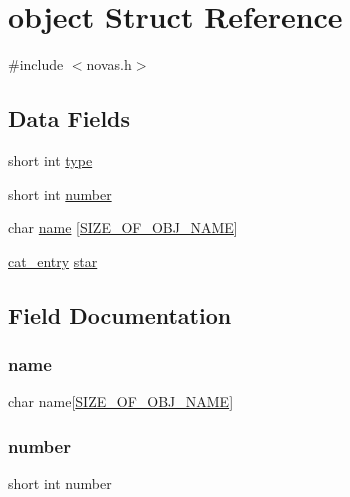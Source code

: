 \hypertarget{structobject}{}\section{object Struct Reference}
\label{structobject}


{\ttfamily \#include $<$novas.\+h$>$}

\subsection*{Data Fields}
\begin{DoxyCompactItemize}
\item 
short int \mbox{\hyperlink{structobject_aaa8ba4297d83f2cce5af75b18564ae13}{type}}
\item 
short int \mbox{\hyperlink{structobject_ad932ef4a2113097b940a97777b842318}{number}}
\item 
char \mbox{\hyperlink{structobject_ae73ef5f04701dc9d4e7cb1b1c3fa9c12}{name}} \mbox{[}\mbox{\hyperlink{novas_8h_a977a43db51d544f728ea8a22b4a53783}{S\+I\+Z\+E\+\_\+\+O\+F\+\_\+\+O\+B\+J\+\_\+\+N\+A\+ME}}\mbox{]}
\item 
\mbox{\hyperlink{novas_8h_a262daaa71cede05205cfaa727313c1f3}{cat\+\_\+entry}} \mbox{\hyperlink{structobject_a0ead8b30742e9c76887f5ff76cabae7c}{star}}
\end{DoxyCompactItemize}


\subsection{Field Documentation}
\mbox{\label{structobject_ae73ef5f04701dc9d4e7cb1b1c3fa9c12}} 
\subsubsection{\texorpdfstring{name}{name}}
{\footnotesize\ttfamily char name\mbox{[}\mbox{\hyperlink{novas_8h_a977a43db51d544f728ea8a22b4a53783}{S\+I\+Z\+E\+\_\+\+O\+F\+\_\+\+O\+B\+J\+\_\+\+N\+A\+ME}}\mbox{]}}

\mbox{\label{structobject_ad932ef4a2113097b940a97777b842318}} 
\subsubsection{\texorpdfstring{number}{number}}
{\footnotesize\ttfamily short int number}

